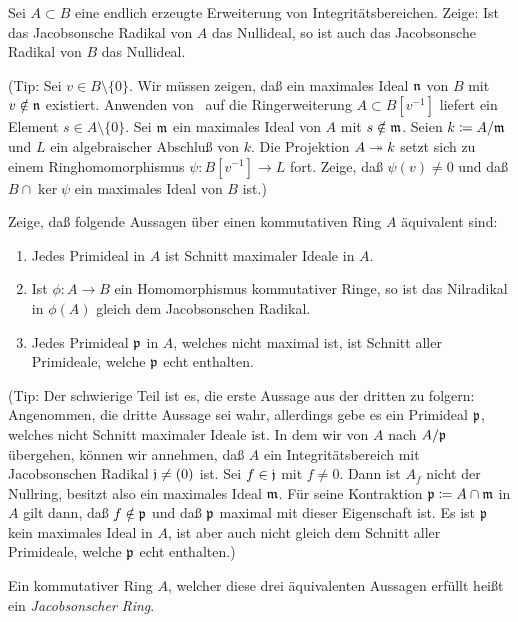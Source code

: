 \begin{exercise}
	\label{exer:trivial_jacobson_ideal}
	Sei \(A \subset B\) eine endlich erzeugte Erweiterung von
	Integritätsbereichen. Zeige: Ist das Jacobsonsche Radikal von \(A\) das
	Nullideal, so ist auch das Jacobsonsche Radikal von \(B\) das Nullideal.
	
	(Tip: Sei \(v \in B \setminus \{0\}\). Wir müssen zeigen, daß ein
	maximales Ideal \(\mathfrak{n}\) von \(B\) mit \(v \notin \mathfrak{n}\) existiert.
	Anwenden von~ auf die Ringerweiterung
	\(A \subset B[v^{-1}]\)
	liefert ein Element \(s \in A \setminus \{0\}\). Sei \(\mathfrak{m}\) ein
	maximales Ideal von \(A\) mit \(s \notin \mathfrak{m}\). Seien \(k \coloneqq
	A/\mathfrak{m}\) und \(L\) ein algebraischer Abschluß von \(k\). Die Projektion
	\(A \twoheadrightarrow k\) setzt sich zu einem Ringhomomorphismus \(\psi\colon B[v^{-1}]
	\to L\) fort. Zeige, daß \(\psi(v) \neq 0\) und daß \(B \cap \ker \psi\)
	ein maximales Ideal von \(B\) ist.)
\end{exercise}

\begin{exercise}
	\label{exer:jacobson_ring}
	Zeige, daß folgende Aussagen über einen kommutativen Ring \(A\) äquivalent
	sind:
	\begin{enumerate}
	\item
		Jedes Primideal in \(A\) ist Schnitt maximaler Ideale in \(A\).
	\item
		Ist \(\phi\colon A \to B\) ein Homomorphismus kommutativer Ringe,
		so ist das Nilradikal in \(\phi(A)\) gleich dem Jacobsonschen
		Radikal.
	\item
		Jedes Primideal \(\mathfrak{p}\) in \(A\), welches nicht maximal ist, ist
		Schnitt aller Primideale, welche \(\mathfrak{p}\) echt enthalten.
	\end{enumerate}
	
	(Tip: Der schwierige Teil ist es, die erste Aussage aus der dritten zu
	folgern: Angenommen, die dritte Aussage sei wahr, allerdings gebe es ein
	Primideal \(\mathfrak{p}\), welches nicht Schnitt maximaler Ideale ist.
	In dem wir von \(A\) nach \(A/\mathfrak{p}\) übergehen, können wir annehmen,
	daß \(A\) ein Integritätsbereich mit Jacobsonschen Radikal \(\mathfrak{j}
	\neq (0)\) ist. Sei \(f \in \mathfrak{j}\) mit \(f \neq 0\). Dann ist \(A_f\)
	nicht der Nullring, besitzt also ein maximales Ideal \(\mathfrak{m}\). Für
	seine Kontraktion \(\mathfrak{p} \coloneqq A \cap \mathfrak{m}\) in \(A\) gilt dann,
	daß \(f \notin \mathfrak{p}\) und daß \(\mathfrak{p}\) maximal mit dieser
	Eigenschaft ist. Es ist \(\mathfrak{p}\) kein maximales Ideal in \(A\), ist aber
	auch nicht gleich dem Schnitt aller Primideale, welche \(\mathfrak{p}\) echt
	enthalten.)
	
	Ein kommutativer Ring \(A\), welcher diese drei äquivalenten Aussagen
	erfüllt heißt ein \emph{Jacobsonscher Ring}.
\end{exercise}

